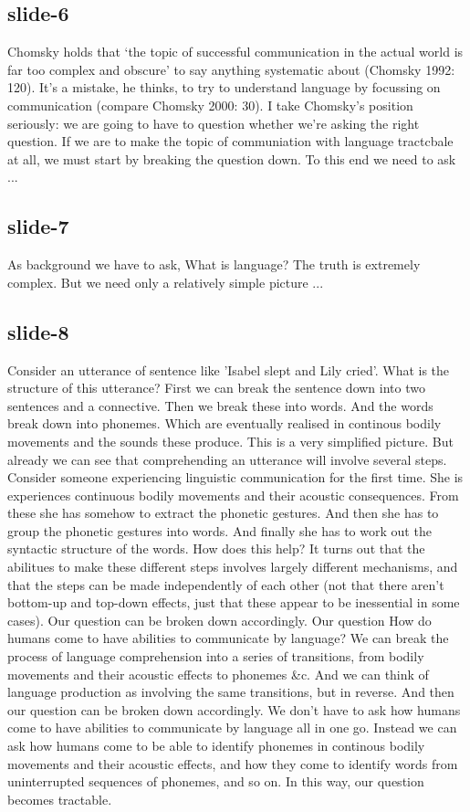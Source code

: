 \documentclass[12pt,\papersize]{extarticle}
\begin{document}
 
\subsection{slide-6}
Chomsky holds that ‘the topic of successful communication in the actual world is far too complex and obscure’ to say anything systematic about (Chomsky 1992: 120). It’s a mistake, he thinks, to try to understand language by focussing on communication (compare Chomsky 2000: 30). I take Chomsky’s position seriously: we are going to have to question whether we’re asking the right question.
If we are to make the topic of communiation with language tractcbale at all, we must start by breaking the question down.
To this end we need to ask ...
 
 
\subsection{slide-7}
As background we have to ask, What is language?
The truth is extremely complex.
But we need only a relatively simple picture ...
 
 
\subsection{slide-8}
Consider an utterance of sentence like 'Isabel slept and Lily cried'.
What is the structure of this utterance?
First we can break the sentence down into two sentences and a connective.
Then we break these into words.
And the words break down into phonemes.
Which are eventually realised in continous bodily movements and the sounds these produce.
This is a very simplified picture.
But already we can see that comprehending an utterance will involve several steps.
Consider someone experiencing linguistic communication for the first time.
She is experiences continuous bodily movements and their acoustic consequences.
From these she has somehow to extract the phonetic gestures.
And then she has to group the phonetic gestures into words.
And finally she has to work out the syntactic structure of the words.
How does this help?
It turns out that the abilitues to make these different steps involves largely different mechanisms, and that the steps can be made independently of each other (not that there aren't bottom-up and top-down effects, just that these appear to be inessential in some cases).
Our question can be broken down accordingly.
Our question How do humans come to have abilities to communicate by language?
We can break the process of language comprehension into a series of transitions, from bodily movements and their acoustic effects to phonemes \&c.
And we can think of language production as involving the same transitions, but in reverse.
And then our question can be broken down accordingly.
We don't have to ask how humans come to have abilities to communicate by language all in one go.
Instead we can ask how humans come to be able to identify phonemes in continous bodily movements and their acoustic effects, and how they come to identify words from uninterrupted sequences of phonemes, and so on.
In this way, our question becomes tractable.
 
\end{document}
